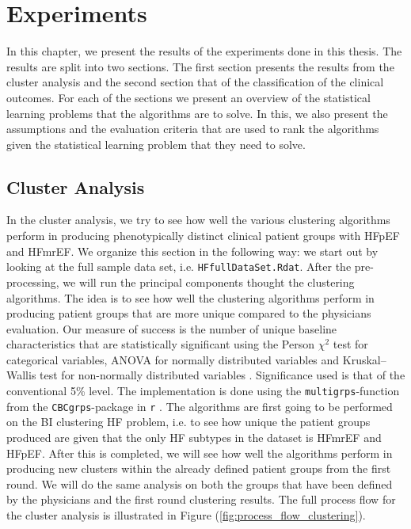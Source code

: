 \documentclass[../thesis.tex]{subfiles}
\begin{document}
\chapter{Experiments}
\label{chap:exp}

\noindent In this chapter, we present the results of the experiments done in this thesis. The results are split into two sections. The first section presents the results from the cluster analysis and the second section that of the classification of the clinical outcomes. For each of the sections we present an overview of the statistical learning problems that the algorithms are to solve. In this, we also present the assumptions and the evaluation criteria that are used to rank the algorithms given the statistical learning problem that they need to solve. 

\section{Cluster Analysis}

\noindent In the cluster analysis, we try to see how well the various clustering algorithms perform in producing phenotypically distinct clinical patient groups with HFpEF and HFmrEF. We organize this section in the following way: we start out by looking at the full sample data set, i.e. \texttt{HFfullDataSet.Rdat}. After the pre-processing, we will run the principal components thought the clustering algorithms. The idea is to see how well the clustering algorithms perform in producing patient groups that are more unique compared to the physicians evaluation. Our measure of success is the number of unique baseline characteristics that are statistically significant using the Person $\chi^2$ test for categorical variables, ANOVA for normally distributed variables and Kruskal–Wallis test for non-normally distributed variables \citep{kruskal1952use}. Significance used is that of the conventional 5\% level. The implementation is done using the \texttt{multigrps}-function from the \texttt{CBCgrps}-package in \texttt{r} \citep{CBCgrps}. The algorithms are first going to be performed on the BI clustering HF problem, i.e. to see how unique the patient groups produced are given that the only HF subtypes in the dataset is HFmrEF and HFpEF. After this is completed, we will see how well the algorithms perform in producing new clusters within the already defined patient groups from the first round. We will do the same analysis on both the groups that have been defined by the physicians and the first round clustering results. The full process flow for the cluster analysis is illustrated in Figure (\ref{fig:process_flow_clustering}).
\end{document}
